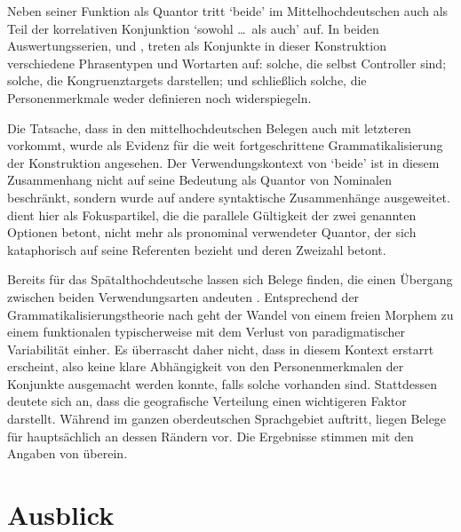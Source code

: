 Neben seiner Funktion als Quantor tritt `beide' im
Mittelhochdeutschen auch als Teil der korrelativen
Konjunktion  `sowohl \dots\ als auch' auf. In beiden
Auswertungs\-serien, \CAO{} und \KC{}, treten als Konjunkte in dieser
Konstruktion verschiedene Phrasen\-typen und Wort\-arten auf: solche, die
selbst Controller sind; solche, die Kongruenztargets darstellen; und
schließlich solche, die Personenmerkmale weder definieren noch widerspiegeln.

Die Tatsache, dass  in den
mittelhochdeutschen Belegen auch mit letzteren vorkommt,
wurde als Evidenz für die weit fortgeschrittene Grammatikalisierung der
Konstruktion angesehen. Der Verwendungskontext von `beide' ist in diesem
Zusammenhang nicht auf seine Bedeutung als Quantor von Nominalen beschränkt,
sondern wurde auf andere syntaktische Zusammenhänge ausgeweitet. 
dient hier als Fokuspartikel, die die parallele Gültigkeit der zwei genannten
Optionen betont, nicht mehr als pronominal verwendeter Quantor, der sich
kataphorisch auf seine Referenten bezieht und deren Zweizahl betont.

Bereits für das Spätalthochdeutsche lassen sich Belege
finden, die einen Übergang zwischen beiden Verwendungsarten andeuten
\autocite[vgl.\ die Beispiele in][627]{ksw2}. Entsprechend der
Grammatikalisierungstheorie nach \citet[146--150]{lehmann2015} geht der Wandel
von einem freien Morphem zu einem funktionalen typischerweise mit dem Verlust
von paradigmatischer Variabilität einher. Es überrascht daher nicht, dass
 in diesem Kontext erstarrt erscheint, also keine klare
Abhängigkeit von den Personenmerkmalen der Konjunkte ausgemacht werden konnte,
falls solche vorhanden sind. Stattdessen deutete sich an, dass die geografische
Verteilung einen wichtigeren Faktor darstellt. Während  im ganzen
oberdeutschen Sprachgebiet auftritt, liegen Belege für 
hauptsächlich an dessen Rändern vor. Die Ergebnisse stimmen mit den Angaben von
\citet[627--628]{ksw2} überein.

\section{Ausblick}

